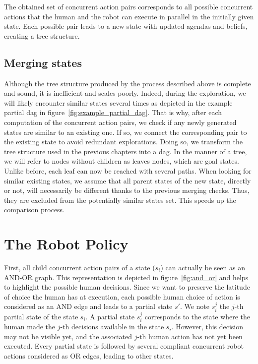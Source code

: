 The obtained set of concurrent action pairs corresponds to all possible concurrent actions that the human and the robot can execute in parallel in the initially given state. Each possible pair leads to a new state with updated agendas and beliefs, creating a tree structure. 

    \subsection{Merging states}

Although the tree structure produced by the process described above is complete and sound, it is inefficient and scales poorly. Indeed, during the exploration, we will likely encounter similar states several times as depicted in the example partial \acrshort{dag} in figure~\ref{fig:example_partial_dag}. That is why, after each computation of the concurrent action pairs, we check if any newly generated states are similar to an existing one. If so, we connect the corresponding pair to the existing state to avoid redundant explorations. Doing so, we transform the tree structure used in the previous chapters into a \acrfull{dag}. In the manner of a tree, we will refer to nodes without children as leaves nodes, which are goal states. Unlike before, each leaf can now be reached with several paths. 
When looking for similar existing states, we assume that all parent states of the new state, directly or not, will necessarily be different thanks to the previous merging checks. Thus, they are excluded from the potentially similar states set. This speeds up the comparison process. 

\section{The Robot Policy}

First, all child concurrent action pairs of a state ($s_i$) can actually be seen as an AND-OR graph. This representation is depicted in figure~\ref{fig:and_or} and helps to highlight the possible human decisions. 
Since we want to preserve the latitude of choice the human has at execution, each possible human choice of action is considered as an AND edge and leads to a partial state $s'$. 
We note $s_i^j$ the $j$-th partial state of the state $s_i$. A partial state $s_i^j$ corresponds to the state where the human made the $j$-th decisions available in the state $s_i$. However, this decision may not be visible yet, and the associated $j$-th human action has not yet been executed.
Every partial state is followed by several compliant concurrent robot actions considered as OR edges, leading to other states.

